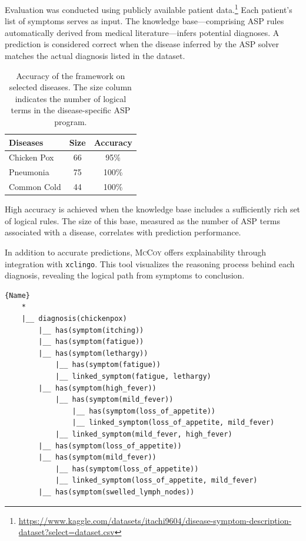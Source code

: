 \documentclass[11pt,leqno]{amsart}
\newcommand{\src}[1]{\texttt{#1}}
\newcommand{\sys}{\textsc{McCoy}\xspace}
\begin{document}
Evaluation was conducted using publicly available patient data.\footnote{\url{https://www.kaggle.com/datasets/itachi9604/disease-symptom-description-dataset?select=dataset.csv}}
Each patient's list of symptoms serves as input.  
The knowledge base—comprising ASP rules automatically derived  
from medical literature—infers potential diagnoses.  
A prediction is considered correct when the disease inferred  
by the ASP solver matches the actual diagnosis listed in the dataset.

\begin{table}[h]
    \centering
    \caption{Accuracy of the framework on selected diseases. 
    The size column indicates the number of logical terms in the disease-specific ASP program.}
    \begin{tabular}{lcc}
    \toprule
    Diseases & Size & Accuracy \\
    \midrule
    Chicken Pox    &  66  & 95\% \\
    Pneumonia      &  75  & 100\% \\
    Common Cold    &  44  & 100\% \\
    \bottomrule
    \end{tabular}
\end{table}

High accuracy is achieved when the knowledge base includes a sufficiently 
rich set of logical rules. The size of this base, measured as the number 
of ASP terms associated with a disease, correlates with prediction performance.

In addition to accurate predictions, \sys offers explainability 
through integration with \src{xclingo}. 
This tool visualizes the reasoning process behind each diagnosis, 
revealing the logical path from symptoms to conclusion.

\begin{lstlisting}[caption={Excerpt from the explanation tree for the chickenpox diagnosis. The structure illustrates the reasoning path based on symptom associations (slightly modified for clarity).},
    label=lst:chickenpox-explanation]{Name}
    *
    |__ diagnosis(chickenpox)
        |__ has(symptom(itching))
        |__ has(symptom(fatigue))
        |__ has(symptom(lethargy))
            |__ has(symptom(fatigue))
            |__ linked_symptom(fatigue, lethargy)
        |__ has(symptom(high_fever))
            |__ has(symptom(mild_fever))
                |__ has(symptom(loss_of_appetite))
                |__ linked_symptom(loss_of_appetite, mild_fever)
            |__ linked_symptom(mild_fever, high_fever)
        |__ has(symptom(loss_of_appetite))
        |__ has(symptom(mild_fever))
            |__ has(symptom(loss_of_appetite))
            |__ linked_symptom(loss_of_appetite, mild_fever)
        |__ has(symptom(swelled_lymph_nodes))
\end{lstlisting}
    
\end{document}
